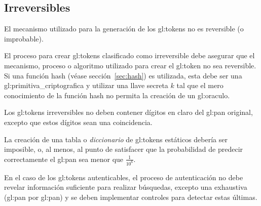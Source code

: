 %
%

\subsection{Irreversibles}

{
  El mecanismo utilizado para la generación de los \glspl{gl:token}
  no es reversible (o improbable).
}

{
  El proceso para crear \glspl{gl:token} clasificado como irreversible
  debe asegurar que el mecanismo, proceso o algoritmo utilizado para
  crear el \gls{gl:token} no sea reversible. Si una función hash (véase
  sección~\ref{sec:hash}) es utilizada, esta debe ser una
  \gls{gl:primitiva_criptografica} y utilizar una llave secreta $k$ tal que
  el mero conocimiento de la función hash no permita la creación de un
  \gls{gl:oraculo}.
}

{
  Los \glspl{gl:token} irreversibles no deben contener dígitos en claro del
  \gls{gl:pan} original, excepto que estos dígitos sean una coincidencia.
}

{
  La creación de una tabla o \textit{diccionario} de \glspl{gl:token}
  estáticos debería ser imposible, o, al menos, al punto de satisfacer que
  la probabilidad de predecir correctamente el \gls{gl:pan} sea menor que
  $\frac{1}{10^6}$.
}

{
  En el caso de los \glspl{gl:token} autenticables, el proceso de
  autenticación no debe revelar información suficiente para realizar
  búsquedas, excepto una exhaustiva (\gls{gl:pan} por \gls{gl:pan}) y se
  deben implementar controles para detectar estas últimas.
}

